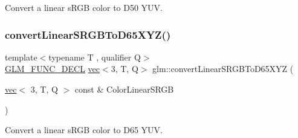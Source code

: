 Convert a linear s\+R\+GB color to D50 Y\+UV. 

\mbox{\label{group__gtx__color__encoding_gaf9e130d9d4ccf51cc99317de7449f369}} 
\subsubsection{\texorpdfstring{convert\+Linear\+S\+R\+G\+B\+To\+D65\+X\+Y\+Z()}{convertLinearSRGBToD65XYZ()}}
{\footnotesize\ttfamily template$<$typename T , qualifier Q$>$ \\
\mbox{\hyperlink{setup_8hpp_ab2d052de21a70539923e9bcbf6e83a51}{G\+L\+M\+\_\+\+F\+U\+N\+C\+\_\+\+D\+E\+CL}} \mbox{\hyperlink{structglm_1_1vec}{vec}}$<$3, T, Q$>$ glm\+::convert\+Linear\+S\+R\+G\+B\+To\+D65\+X\+YZ (\begin{DoxyParamCaption}\item[{\mbox{\hyperlink{structglm_1_1vec}{vec}}$<$ 3, T, Q $>$ const \&}]{Color\+Linear\+S\+R\+GB }\end{DoxyParamCaption})}



Convert a linear s\+R\+GB color to D65 Y\+UV. 


